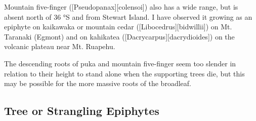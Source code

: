 Mountain five-finger ([Pseudopanax][colensoi]) also has a wide range, but is absent north of 36 °S and from Stewart Island.
I have observed it growing as an epiphyte on kaikawaka or mountain cedar ([Libocedrus][bidwillii]) on Mt.
Taranaki (Egmont) and on kahikatea ([Dacrycarpus][dacrydioides]) on the volcanic plateau near Mt.
Ruapehu.

The descending roots of puka and mountain five-finger seem too slender in relation to their height to stand alone when the supporting trees die, but this may be possible for the more massive roots of the broadleaf.

\subsection{Tree or Strangling Epiphytes}

